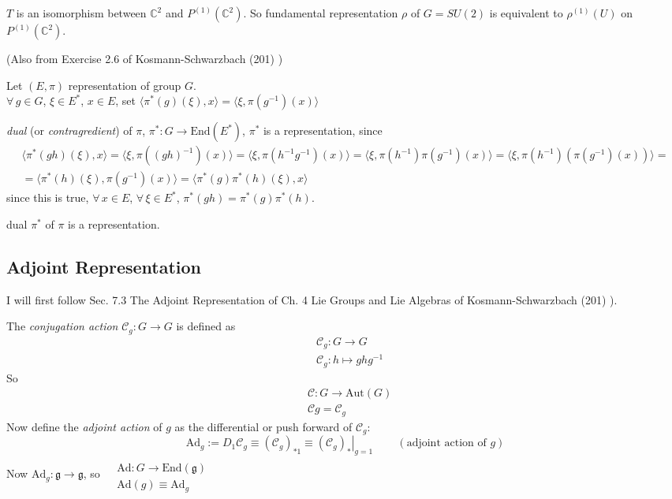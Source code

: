 \documentclass[10pt]{amsart}
\newcommand{\exercisehead}[1]
  { \smallskip
   \noindent{\small\bf Exercise #1.}
  }
\begin{document}
\begin{multicols*}{2}
$T$ is an isomorphism between $\mathbb{C}^2$ and $P^{(1)}(\mathbb{C}^2)$.  So fundamental representation $\rho$ of $G=SU(2)$ is equivalent to $\rho^{(1)}(U)$ on $P^{(1)}(\mathbb{C}^2)$.  

\exercisehead{23}\cite{JBaezJMuniain1994} (Also from Exercise 2.6 of Kosmann-Schwarzbach (201) \cite{YKosmann-Schwarzbach2010})

Let $(E,\pi)$ representation of group $G$.  \\
$\forall \, g \in G$, $\xi \in E^*$, $x\in E$, set $\langle \pi^*(g)(\xi), x \rangle = \langle \xi, \pi(g^{-1})(x) \rangle$

 \emph{dual} (or \emph{contragredient}) of $\pi$, $\pi^*:G \to \text{End}(E^*)$, $\pi^*$ is a representation, since
\[
\begin{gathered}
  \langle \pi^*(gh)(\xi),x\rangle = \langle \xi, \pi((gh)^{-1})(x) \rangle = \langle \xi, \pi(h^{-1}g^{-1})(x) \rangle = \langle \xi, \pi(h^{-1}) \pi(g^{-1})(x) \rangle = \langle \xi, \pi(h^{-1}) (\pi(g^{-1})(x)) \rangle =  \\
= \langle \pi^*(h)(\xi), \pi(g^{-1})(x) \rangle = \langle \pi^*(g)\pi^*(h)(\xi), x \rangle
\end{gathered}
\]
since this is true, $\forall \, x \in E$, $\forall \, \xi \in E^*$, $\pi^*(gh) = \pi^*(g)\pi^*(h)$.  

dual $\pi^*$ of $\pi$ is a representation.  


\subsection{Adjoint Representation}

I will first follow Sec. 7.3 The Adjoint Representation of Ch. 4 Lie Groups and Lie Algebras of Kosmann-Schwarzbach (201) \cite{YKosmann-Schwarzbach2010}).  

The \emph{conjugation action} $\mathcal{C}_g:G\to G$ is defined as 
\[
\begin{aligned}
  & \mathcal{C}_g:G\to G \\
  &  \mathcal{C}_g: h \mapsto ghg^{-1}
\end{aligned}
\]
So 
\[
\begin{aligned}
  & \mathcal{C}: G \to \text{Aut}(G) \\ 
  & \mathcal{C}g = \mathcal{C}_g
\end{aligned}
\]
Now define the \emph{adjoint action} of $g$ as the differential or push forward of $\mathcal{C}_g$:
\[
\text{Ad}_g := D_1 \mathcal{C}_g \equiv (\mathcal{C}_g)_{*1} \equiv \left. (\mathcal{C}_g )_* \right|_{g=1}  \qquad \, (\text{adjoint action of $g$})
\]
Now $\text{Ad}_g: \mathfrak{g} \to \mathfrak{g}$, so $\begin{aligned} & \quad \\
   & \text{Ad}:G \to \text{End}(\mathfrak{g}) \\
  & \text{Ad}(g) \equiv \text{Ad}_g \end{aligned}$


\end{multicols*}
\end{document}

